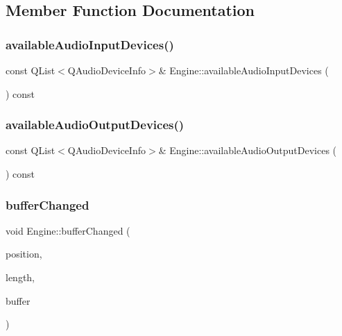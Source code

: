 \subsection{Member Function Documentation}
\hypertarget{class_engine_a6e06ecaa303e1b03581ce9ea296740e8}{}\label{class_engine_a6e06ecaa303e1b03581ce9ea296740e8} 
\subsubsection{\texorpdfstring{available\+Audio\+Input\+Devices()}{availableAudioInputDevices()}}
{\footnotesize\ttfamily const Q\+List$<$Q\+Audio\+Device\+Info$>$\& Engine\+::available\+Audio\+Input\+Devices (\begin{DoxyParamCaption}{ }\end{DoxyParamCaption}) const\hspace{0.3cm}{\ttfamily [inline]}}

\hypertarget{class_engine_a6b4c101c20dcd1843832049c379c334b}{}\label{class_engine_a6b4c101c20dcd1843832049c379c334b} 
\subsubsection{\texorpdfstring{available\+Audio\+Output\+Devices()}{availableAudioOutputDevices()}}
{\footnotesize\ttfamily const Q\+List$<$Q\+Audio\+Device\+Info$>$\& Engine\+::available\+Audio\+Output\+Devices (\begin{DoxyParamCaption}{ }\end{DoxyParamCaption}) const\hspace{0.3cm}{\ttfamily [inline]}}

\hypertarget{class_engine_a4e54e59d1adc73cce8f6d2c4457dc06d}{}\label{class_engine_a4e54e59d1adc73cce8f6d2c4457dc06d} 
\subsubsection{\texorpdfstring{buffer\+Changed}{bufferChanged}}
{\footnotesize\ttfamily void Engine\+::buffer\+Changed (\begin{DoxyParamCaption}\item[{qint64}]{position,  }\item[{qint64}]{length,  }\item[{const Q\+Byte\+Array \&}]{buffer }\end{DoxyParamCaption})\hspace{0.3cm}{\ttfamily [signal]}}

